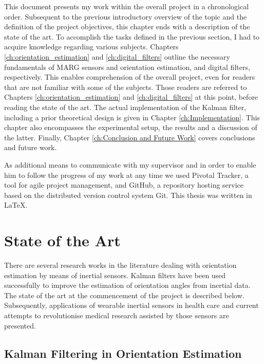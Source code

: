 This document presents my work within the overall project in a chronological order. Subsequent to the previous introductory overview of the topic and the definition of the project objectives, this chapter ends with a description of the state of the art. To accomplish the tasks defined in the previous section, I had to acquire knowledge regarding various subjects. Chapters \ref{ch:orientation_estimation} and \ref{ch:digital_filters} outline the necessary fundamentals of MARG sensors and orientation estimation, and digital filters, respectively. This enables comprehension of the overall project, even for readers that are not familiar with some of the subjects. Those readers are referred to Chapters \ref{ch:orientation_estimation} and \ref{ch:digital_filters} at this point, before reading the state of the art. The actual implementation of the Kalman filter, including a prior theoretical design is given in Chapter \ref{ch:Implementation}. This chapter also encompasses the experimental setup, the results and a discussion of the latter. Finally, Chapter \ref{ch:Conclusion and Future Work} covers conclusions and future work.

As additional means to communicate with my supervisor and in order to enable him to follow the progress of my work at any time we used Pivotal Tracker, a tool for agile project management, and GitHub, a repository hosting service based on the distributed version control system Git. This thesis was written in \LaTeX{}.
 
\section{State of the Art}\label{sec:state_of_the_art}

There are several research works in the literature dealing with orientation estimation by means of inertial sensors. Kalman filters have been used successfully to improve the estimation of orientation angles from inertial data. The state of the art at the commencement of the project is described below. Subsequently, applications of wearable inertial sensors in health care and current attempts to revolutionise medical research assisted by those sensors are presented.

\subsection{Kalman Filtering in Orientation Estimation} \label{sec:state_of_the_art_kalman}

